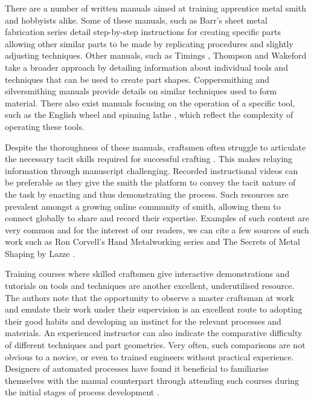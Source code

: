 There are a number of written manuals aimed at training apprentice metal smith and hobbyists alike. Some of these manuals, such as Barr's sheet metal fabrication series \citep{Barr2013ProfessionalFabrication,Barr2019SheetProjects} detail step-by-step instructions for creating specific parts allowing other similar parts to be made by replicating procedures and slightly adjusting techniques. Other manuals, such as Timings \citep{Timings2008SheetMetalwork}, Thompson \citep{Thompson2007ManufacturingProfessionals} and Wakeford \citep{Wakeford1985SheetWork} take a broader approach by detailing information about individual tools and techniques that can be used to create part shapes. Coppersmithing \citep{Fuller1904ArtForms} and silversmithing \citep{Hill2014ManufacturingProcesses} manuals provide details on similar techniques used to form material. There also exist manuals focusing on the operation of a specific tool, such as the English wheel \citep{Longyard2014LearningWheel} and spinning lathe \citep{Tuells1912MetalUsed}, which reflect the complexity of operating these tools.

Despite the thoroughness of these manuals, craftsmen often struggle to articulate the necessary tacit skills required for successful crafting \citep{Wood2009ACraftsmen}. This makes relaying information through manuscript challenging. Recorded instructional videos can be preferable as they give the smith the platform to convey the tacit nature of the task by enacting and thus demonstrating the process. Such resources are prevalent amongst a growing online community of smith, allowing them to connect globally to share and record their expertise. Examples of such content are very common and for the interest of our readers, we can cite a few sources of such work such as Ron Corvell's Hand Metalworking series \citep{CorvellRonSeries} and The Secrets of Metal Shaping by Lazze \citep{LazzeTheShaping}.

Training courses where skilled craftsmen give interactive demonstrations and tutorials on tools and techniques are another excellent, underutilised resource. The authors note that the opportunity to observe a master craftsman at work and emulate their work under their supervision is an excellent route to adopting their good habits and developing an instinct for the relevant processes and materials. An experienced instructor can also indicate the comparative difficulty of different techniques and part geometries. Very often, such comparisons are not obvious to a novice, or even to trained engineers without practical experience. Designers of automated processes have found it beneficial to familiarise themselves with the manual counterpart through attending such courses during the initial stages of process development \citep{Ilangovan2016FixturelessForming}.

